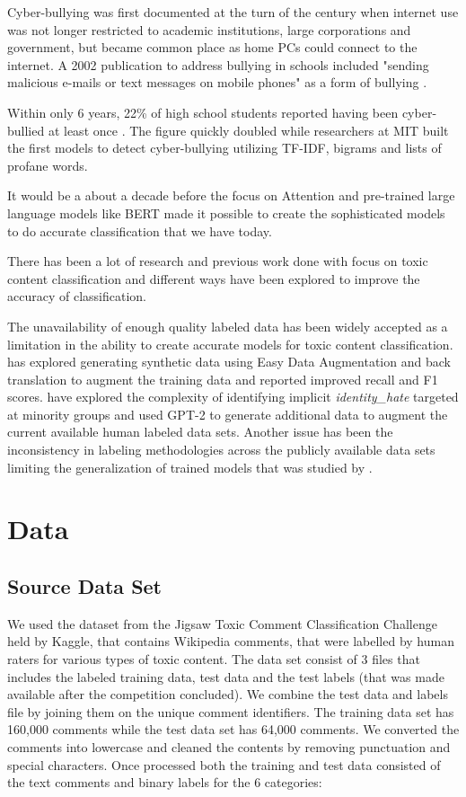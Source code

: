 \documentclass[11pt,a4paper]{article}
\begin{document}
Cyber-bullying was first documented at the turn of the century when internet use was not longer restricted to academic institutions, large corporations and government, but became common place as home PCs could connect to the internet.  A 2002 publication to address bullying in schools included "sending malicious e-mails or text messages on mobile phones" as a form of bullying  \cite{petersmithBullying}.

Within only 6 years, 22\% of high school students reported having been cyber-bullied at least once \cite{Cyberbullying2008}.  The figure quickly doubled while researchers at MIT built the first models to detect cyber-bullying \cite{cyberbullyingMIT} utilizing TF-IDF, bigrams and lists of profane words.

It would be a about a decade before the focus on Attention \cite{Attention} and pre-trained large language models like BERT \cite{Bert} made it possible to create the sophisticated models to do accurate classification that we have today. 

There has been a lot of research and previous work done with focus on toxic content classification and different ways have been explored to improve the accuracy of classification. 

The unavailability of enough quality labeled data has been widely accepted as a limitation in the ability to create accurate models for toxic content classification. \cite{rastogi2020can} has explored generating synthetic data using Easy Data Augmentation and back translation to augment the training data and reported improved recall and F1 scores. \cite{hartvigsen2022toxigen} have explored the complexity of identifying implicit \emph{identity\_hate} targeted at minority groups and used GPT-2 to generate additional data to augment the current available human labeled data sets. 
Another issue has been the inconsistency in labeling methodologies across the publicly available data sets limiting the generalization of trained models that was studied by \cite{fortuna2020toxic}. 

\section{Data}

\subsection{Source Data Set}
We used the dataset from the Jigsaw Toxic Comment Classification Challenge held by Kaggle, that contains Wikipedia comments, that were labelled by human raters for various types of toxic content.  The data set consist of 3 files that includes the labeled training data, test data and the test labels (that was made available after the competition concluded).  We combine the test data and labels file by joining them on the unique comment identifiers. The training data set has 160,000 comments while the test data set has 64,000 comments. We converted the comments into lowercase and cleaned the contents by removing punctuation and special characters. Once processed both the training and test data  consisted of the text comments and binary labels for the 6 categories:
\end{document}
